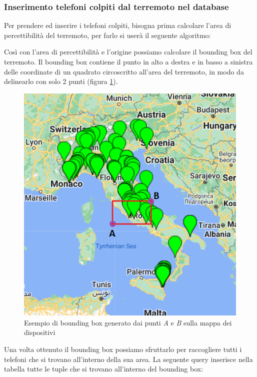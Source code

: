 \documentclass[main.tex]{subfiles}
\begin{document}
\subsubsection{Inserimento telefoni colpiti dal terremoto nel database}
Per prendere ed inserire i telefoni colpiti, bisogna prima calcolare l'area di percettibilità del terremoto, per farlo si userà il seguente algoritmo:

Così con l'area di percettibilità e l'origine possiamo calcolare il bounding box del terremoto. Il bounding box contiene il punto in alto a destra e in basso a sinistra delle coordinate di un quadrato circoscritto all'area del terremoto, in modo da delinearlo con solo 2 punti (figura \ref{fig:bbox}).

\begin{figure}[H]
    \centering
    \includegraphics[]{img/Post-Earthquake/bounding-box.PNG}
    \caption{Esempio di bounding box generato dai punti \emph{A} e \emph{B} sulla mappa dei dispositivi}
    \label{fig:bbox}
\end{figure}
Una volta ottenuto il bounding box possiamo sfruttarlo per raccogliere tutti i telefoni che si trovano all'interno della sua area. La seguente query inserisce nella tabella  tutte le tuple che si trovano all'interno del bounding box:
\end{document}
